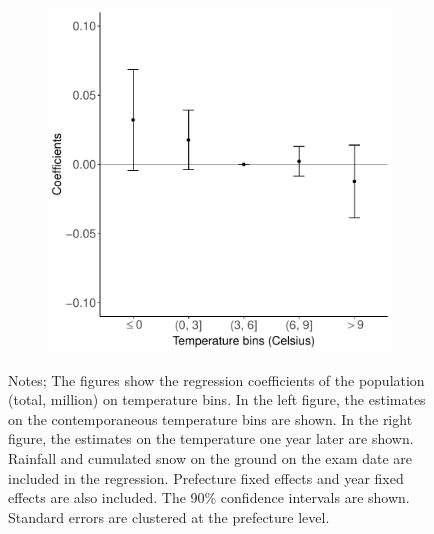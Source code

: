 \documentclass[10pt, pdfmx,hiresbb]{beamer}
\begin{document}
\begin{frame}
\begin{figure}
\begin{minipage}{0.44\textwidth}
\begin{figure}[h]
        \includegraphics[width = \textwidth]{../Output/images/pop_reg_f1.pdf}
        \centering
      \end{figure}
    \end{minipage}
    \tiny
    \begin{tablenotes}
    \item Notes;
      The figures show the regression coefficients of the population (total, million) on temperature bins.
      In the left figure, the estimates on the contemporaneous temperature bins are shown.
      In the right figure, the estimates on the temperature one year later are shown.
      Rainfall and cumulated snow on the ground on the exam date are included in the regression.
      Prefecture fixed effects and year fixed effects are also included.
      The 90\% confidence intervals are shown.
      Standard errors are clustered at the prefecture level.
    \end{tablenotes}
  \end{figure}
\end{frame}
\end{document}
